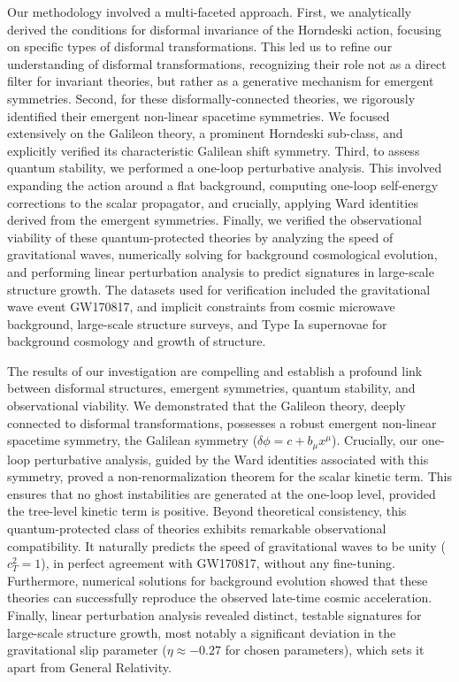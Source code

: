 \documentclass[twocolumn]{aastex631}
\begin{document}
Our methodology involved a multi-faceted approach. First, we analytically derived the conditions for disformal invariance of the Horndeski action, focusing on specific types of disformal transformations. This led us to refine our understanding of disformal transformations, recognizing their role not as a direct filter for invariant theories, but rather as a generative mechanism for emergent symmetries. Second, for these disformally-connected theories, we rigorously identified their emergent non-linear spacetime symmetries. We focused extensively on the Galileon theory, a prominent Horndeski sub-class, and explicitly verified its characteristic Galilean shift symmetry. Third, to assess quantum stability, we performed a one-loop perturbative analysis. This involved expanding the action around a flat background, computing one-loop self-energy corrections to the scalar propagator, and crucially, applying Ward identities derived from the emergent symmetries. Finally, we verified the observational viability of these quantum-protected theories by analyzing the speed of gravitational waves, numerically solving for background cosmological evolution, and performing linear perturbation analysis to predict signatures in large-scale structure growth. The datasets used for verification included the gravitational wave event GW170817, and implicit constraints from cosmic microwave background, large-scale structure surveys, and Type Ia supernovae for background cosmology and growth of structure.

The results of our investigation are compelling and establish a profound link between disformal structures, emergent symmetries, quantum stability, and observational viability. We demonstrated that the Galileon theory, deeply connected to disformal transformations, possesses a robust emergent non-linear spacetime symmetry, the Galilean symmetry ($\delta\phi = c + b_\mu x^\mu$). Crucially, our one-loop perturbative analysis, guided by the Ward identities associated with this symmetry, proved a non-renormalization theorem for the scalar kinetic term. This ensures that no ghost instabilities are generated at the one-loop level, provided the tree-level kinetic term is positive. Beyond theoretical consistency, this quantum-protected class of theories exhibits remarkable observational compatibility. It naturally predicts the speed of gravitational waves to be unity ($c_T^2=1$), in perfect agreement with GW170817, without any fine-tuning. Furthermore, numerical solutions for background evolution showed that these theories can successfully reproduce the observed late-time cosmic acceleration. Finally, linear perturbation analysis revealed distinct, testable signatures for large-scale structure growth, most notably a significant deviation in the gravitational slip parameter ($\eta \approx -0.27$ for chosen parameters), which sets it apart from General Relativity.
\end{document}
